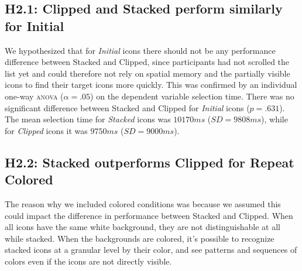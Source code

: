 \documentclass{tufte-book} %
\begin{document}
\subsection{H2.1: Clipped and Stacked perform similarly for Initial}
We hypothesized that for \emph{Initial} icons there should not be any performance difference between Stacked and Clipped, since participants had not scrolled the list yet and could therefore not rely on spatial memory and the partially visible icons to find their target icons more quickly. This was confirmed by an individual one-way \textsc{anova} ($\alpha = .05$) on the dependent variable selection time. There was no significant difference between Stacked and Clipped for \emph{Initial} icons ($p = .631$). The mean selection time for \emph{Stacked} icons was $10170 ms$ ($SD = 9808 ms$), while for \emph{Clipped} icons it was $9750 ms$ ($SD = 9000 ms$).

\subsection{H2.2: Stacked outperforms Clipped for Repeat Colored}
The reason why we included colored conditions was because we assumed this could impact the difference in performance between Stacked and Clipped. When all icons have the same white background, they are not distinguishable at all while stacked. When the backgrounds are colored, it's possible to recognize stacked icons at a granular level by their color, and see patterns and sequences of colors even if the icons are not directly visible.
\end{document}

